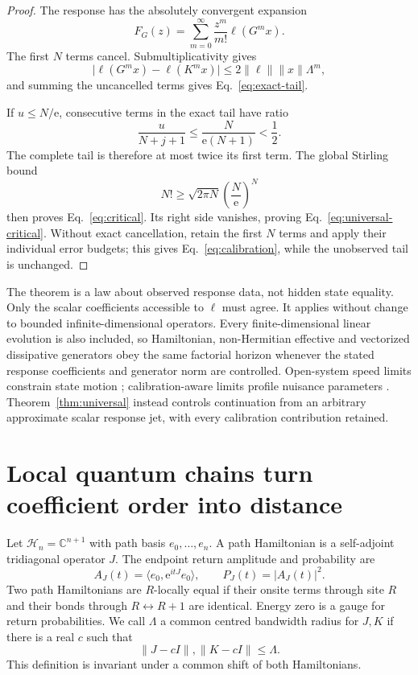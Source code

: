 \documentclass[10pt]{article}
\numberwithin{equation}{section}
\theoremstyle{definition}
\theoremstyle{remark}
\newcommand{\C}{\mathbb C}
\newcommand{\ee}{\mathrm e}
\newcommand{\ip}[2]{\langle #1,#2\rangle}
\newcommand{\norm}[1]{\lVert #1\rVert}
\begin{document}
\begin{proof}
The response has the absolutely convergent expansion
\[
 F_G(z)=\sum_{m=0}^{\infty}
   \frac{z^m}{m!}\ell(G^m x).
\]
The first \(N\) terms cancel.  Submultiplicativity gives
\[
 \big|\ell(G^m x)-\ell(K^m x)\big|
 \le 2\norm{\ell}\norm{x}\Lambda^m,
\]
and summing the uncancelled terms gives Eq.~\eqref{eq:exact-tail}.

If \(u\le N/\ee\), consecutive terms in the exact tail have ratio
\[
 \frac{u}{N+j+1}\le\frac{N}{\ee(N+1)}<\frac12.
\]
The complete tail is therefore at most twice its first term.  The global
Stirling bound
\[
 N!\ge\sqrt{2\pi N}\left(\frac{N}{\ee}\right)^N
\]
then proves Eq.~\eqref{eq:critical}.  Its right side vanishes, proving
Eq.~\eqref{eq:universal-critical}.  Without exact cancellation, retain the
first \(N\) terms and apply their individual error budgets; this gives
Eq.~\eqref{eq:calibration}, while the unobserved tail is unchanged.
\end{proof}

The theorem is a law about observed response data, not hidden state
equality.  Only the scalar coefficients accessible to \(\ell\) must agree.
It applies without change to bounded infinite-dimensional operators.  Every
finite-dimensional linear evolution is also included, so Hamiltonian,
non-Hermitian effective and vectorized dissipative generators obey the same
factorial horizon whenever the stated response coefficients and generator
norm are controlled.  Open-system speed limits constrain state motion
\cite{DelCampoEtAl2013}; calibration-aware limits profile nuisance
parameters \cite{WaniAlKuwari2026}.  Theorem~\ref{thm:universal} instead
controls continuation from an arbitrary approximate scalar response jet,
with every calibration contribution retained.

\section{Local quantum chains turn coefficient order into distance}

Let \(\mathcal H_n=\C^{n+1}\) with path basis
\(e_0,\ldots,e_n\).  A path Hamiltonian is a self-adjoint tridiagonal
operator \(J\).  The endpoint return amplitude and probability are
\begin{equation}
 A_J(t)=\ip{e_0}{\ee^{itJ}e_0},
 \qquad
 P_J(t)=|A_J(t)|^2.
\label{eq:return}
\end{equation}
Two path Hamiltonians are \(R\)-locally equal if their onsite terms through
site \(R\) and their bonds through \(R\leftrightarrow R+1\) are identical.
Energy zero is a gauge for return probabilities.  We call \(\Lambda\) a
common centred bandwidth radius for \(J,K\) if there is a real \(c\) such
that
\begin{equation}
 \norm{J-cI},\norm{K-cI}\le\Lambda .
\label{eq:centered-radius}
\end{equation}
This definition is invariant under a common shift of both Hamiltonians.
\end{document}
